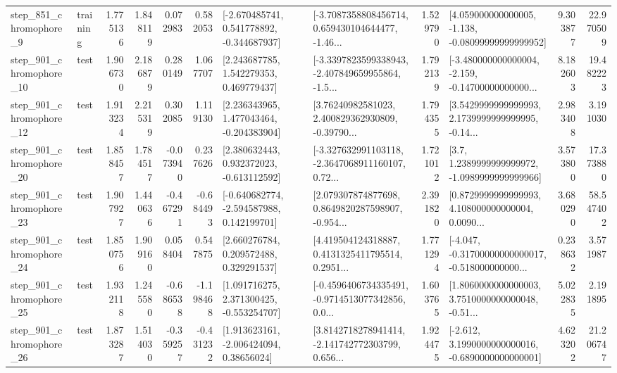 \begin{tabular}{llrrrrllrlrr}
   step\_851\_chromophore\_9 &  training &      1.775136 &    1.848119 &      0.072983 &  0.582053 &   [-2.670485741, 0.541778892, -0.344687937] &  [-3.7087358808456714, 0.659430104644477, -1.46... &       1.529790 &  [4.059000000000005, -1.138, -0.08099999999999952] &            9.303877 &         22.970509 \\
  step\_901\_chromophore\_10 &      test &      1.906730 &    2.186879 &      0.280149 &  1.067707 &     [2.243687785, 1.542279353, 0.469779437] &  [-3.3397823599338943, -2.407849659955864, -1.5... &       1.792139 &  [-3.480000000000004, -2.159, -0.14700000000000... &            8.182603 &         19.482223 \\
  step\_901\_chromophore\_12 &      test &      1.913234 &    2.215319 &      0.302085 &  1.119130 &    [2.236343965, 1.477043464, -0.204383904] &  [3.76240982581023, 2.400829362930809, -0.39790... &       1.794355 &  [3.5429999999999993, 2.1739999999999995, -0.14... &            2.983408 &          3.191030 \\
  step\_901\_chromophore\_20 &      test &      1.858457 &    1.784517 &     -0.073940 &  0.237626 &    [2.380632443, 0.932372023, -0.613112592] &  [-3.327632991103118, -2.3647068911160107, 0.72... &       1.721012 &     [3.7, 1.2389999999999972, -1.0989999999999966] &            3.573800 &         17.373880 \\
  step\_901\_chromophore\_23 &      test &      1.907927 &    1.440636 &     -0.467291 & -0.684493 &   [-0.640682774, -2.594587988, 0.142199701] &  [2.079307874877698, 0.8649820287598907, -0.954... &       2.391820 &  [0.8729999999999993, 4.108000000000004, 0.0090... &            3.680290 &         58.547402 \\
  step\_901\_chromophore\_24 &      test &      1.850756 &    1.909160 &      0.058404 &  0.547875 &     [2.660276784, 0.209572488, 0.329291537] &  [4.419504124318887, 0.4131325411795514, 0.2951... &       1.771294 &  [-4.047, -0.31700000000000017, -0.518000000000... &            0.238632 &          3.571987 \\
  step\_901\_chromophore\_25 &      test &      1.932118 &    1.245580 &     -0.686538 & -1.198468 &    [1.091716275, 2.371300425, -0.553254707] &  [-0.4596406734335491, -0.9714513077342856, 0.0... &       1.603765 &  [1.8060000000000003, 3.7510000000000048, -0.51... &            5.022835 &          2.191895 \\
  step\_901\_chromophore\_26 &      test &      1.873287 &    1.514030 &     -0.359257 & -0.431232 &     [1.913623161, -2.006424094, 0.38656024] &  [3.8142718278941414, -2.141742772303799, 0.656... &       1.924475 &  [-2.612, 3.1990000000000016, -0.6890000000000001] &            4.623202 &         21.206747 \\

\end{tabular}
